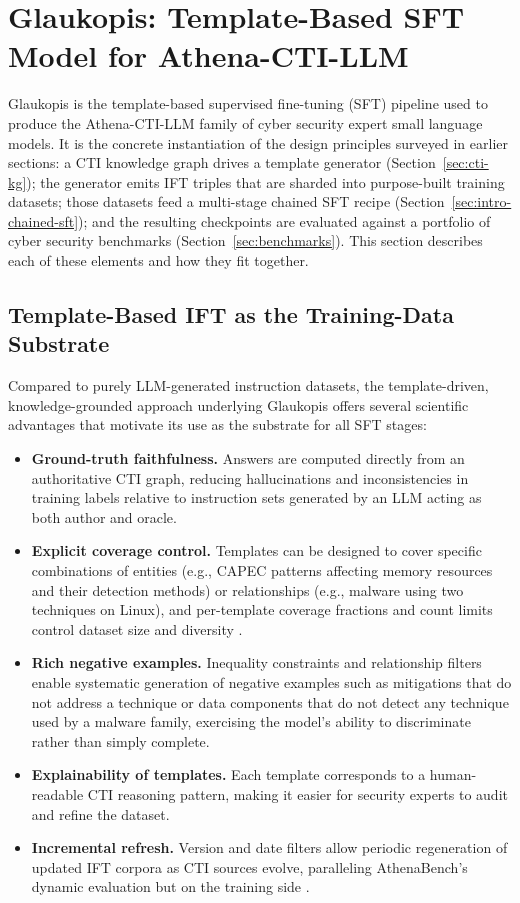\documentclass[unnumsec,webpdf,contemporary,large]{oup-authoring-template}
\theoremstyle{thmstyleone}
\theoremstyle{thmstyletwo}
\theoremstyle{thmstylethree}
\begin{document}
\section{Glaukopis: Template-Based SFT Model for Athena-CTI-LLM}
\label{sec:glaukopis}

Glaukopis is the template-based supervised fine-tuning (SFT) pipeline used to produce the Athena-CTI-LLM family of cyber security expert small language models. It is the concrete instantiation of the design principles surveyed in earlier sections: a CTI knowledge graph drives a template generator (Section~\ref{sec:cti-kg}); the generator emits IFT triples that are sharded into purpose-built training datasets; those datasets feed a multi-stage chained SFT recipe (Section~\ref{sec:intro-chained-sft}); and the resulting checkpoints are evaluated against a portfolio of cyber security benchmarks (Section~\ref{sec:benchmarks}). This section describes each of these elements and how they fit together.

\subsection{Template-Based IFT as the Training-Data Substrate}
\label{sec:glaukopis-template}

Compared to purely LLM-generated instruction datasets, the template-driven, knowledge-grounded approach underlying Glaukopis offers several scientific advantages that motivate its use as the substrate for all SFT stages:

\begin{itemize}
  \item \textbf{Ground-truth faithfulness.} Answers are computed directly from an authoritative CTI graph, reducing hallucinations and inconsistencies in training labels relative to instruction sets generated by an LLM acting as both author and oracle.
  \item \textbf{Explicit coverage control.} Templates can be designed to cover specific combinations of entities (e.g., CAPEC patterns affecting memory resources and their detection methods) or relationships (e.g., malware using two techniques on Linux), and per-template coverage fractions and count limits control dataset size and diversity \cite{cardei2025ift}.
  \item \textbf{Rich negative examples.} Inequality constraints and relationship filters enable systematic generation of negative examples such as mitigations that do not address a technique or data components that do not detect any technique used by a malware family, exercising the model's ability to discriminate rather than simply complete.
  \item \textbf{Explainability of templates.} Each template corresponds to a human-readable CTI reasoning pattern, making it easier for security experts to audit and refine the dataset.
  \item \textbf{Incremental refresh.} Version and date filters allow periodic regeneration of updated IFT corpora as CTI sources evolve, paralleling AthenaBench's dynamic evaluation but on the training side \cite{cardei2025ift,alam2025athenabench}.
\end{itemize}
\end{document}
